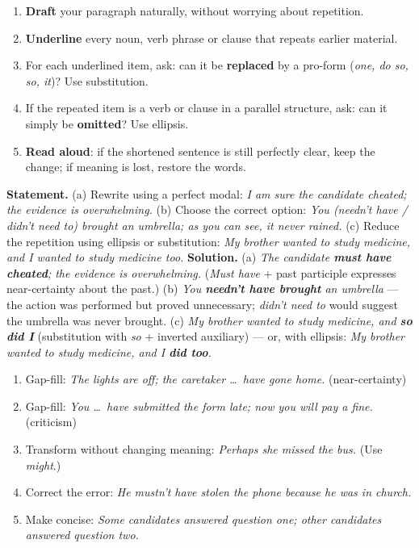 \documentclass[11pt]{article}
\begin{document}
\begin{methode}
\begin{enumerate}
\item \textbf{Draft} your paragraph naturally, without worrying about repetition.
\item \textbf{Underline} every noun, verb phrase or clause that repeats earlier material.
\item For each underlined item, ask: can it be \textbf{replaced} by a pro-form (\emph{one, do so, so, it})? Use substitution.
\item If the repeated item is a verb or clause in a parallel structure, ask: can it simply be \textbf{omitted}? Use ellipsis.
\item \textbf{Read aloud}: if the shortened sentence is still perfectly clear, keep the change; if meaning is lost, restore the words.
\end{enumerate}
\end{methode}

\begin{exoresolu}
\textbf{Statement.} (a) Rewrite using a perfect modal: \emph{I am sure the candidate cheated; the evidence is overwhelming.} (b) Choose the correct option: \emph{You (needn't have / didn't need to) brought an umbrella; as you can see, it never rained.} (c) Reduce the repetition using ellipsis or substitution: \emph{My brother wanted to study medicine, and I wanted to study medicine too.}
\tcblower
\textbf{Solution.} (a) \emph{The candidate \textbf{must have cheated}; the evidence is overwhelming.} (\emph{Must have} + past participle expresses near-certainty about the past.) (b) \emph{You \textbf{needn't have brought} an umbrella} — the action was performed but proved unnecessary; \emph{didn't need to} would suggest the umbrella was never brought. (c) \emph{My brother wanted to study medicine, and \textbf{so did I}} (substitution with \emph{so} + inverted auxiliary) — or, with ellipsis: \emph{My brother wanted to study medicine, and I \textbf{did too}.}
\end{exoresolu}

\begin{exercice}
\begin{enumerate}
\item Gap-fill: \emph{The lights are off; the caretaker \ldots\ have gone home.} (near-certainty)
\item Gap-fill: \emph{You \ldots\ have submitted the form late; now you will pay a fine.} (criticism)
\item Transform without changing meaning: \emph{Perhaps she missed the bus.} (Use \emph{might}.)
\item Correct the error: \emph{He mustn't have stolen the phone because he was in church.}
\item Make concise: \emph{Some candidates answered question one; other candidates answered question two.}
\end{enumerate}
\end{exercice}
\end{document}
